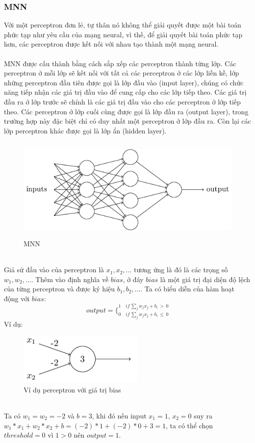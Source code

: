\subsubsection{MNN}
Với một perceptron đơn lẻ, tự thân nó không thể giải quyết được một bài toán 
phức tạp như yêu cầu của mạng neural, vì thế, để giải quyết bài toán phức tạp 
hơn, các perceptron được kết nối với nhau tạo thành một mạng neural.\\\\
MNN được cấu thành bằng cách sắp xếp các perceptron thành 
từng lớp. Các perceptron ở mỗi lớp sẽ kết nối với tất cả các perceptron ở các 
lớp liền kề, lớp những perceptron đầu tiên được gọi là lớp đầu vào (input layer), 
chúng có chức năng tiếp nhận các giá trị đầu vào để cung cấp cho các lớp tiếp 
theo. Các giá trị đầu ra ở lớp trước sẽ chính là các giá trị đầu vào cho 
các perceptron ở lớp tiếp theo. Các perceptron ở lớp cuối cùng được gọi là lớp 
đầu ra (output layer), trong trường hợp này đặc biệt chỉ có duy nhất một 
perceptron ở lớp đầu ra. Còn lại các lớp perceptron khác được gọi là lớp ẩn 
(hidden layer).\\
\begin{figure}[h!]
\centering
\includegraphics[height=2in, keepaspectratio=true]{multilayerneuralnetwork.png}
\caption{MNN}
\end{figure}\\
Giả sử đầu vào của perceptron là $x_1, x_2, ...$ tương ứng là đó là các trọng 
số $w_1, w_2, ...$. Thêm vào định nghĩa về $bias$, ở đây $bias$ là một giá trị 
đại diện độ lệch của từng perceptron và được ký hiệu $b_1, b_2, ...$. Ta có 
biểu diễn của hàm hoạt động với $bias$:\\
\[
  output = 
  \bigg\{
    _{0 \quad if \, \sum_j w_j x_j + b_i\, \leq \, 0}
    ^{1 \quad if \, \sum_j w_j x_j + b_i\, > \, 0}
\]
Ví dụ:\\
\begin{figure}[h!]
\centering
\includegraphics[height=1in, keepaspectratio=true]{exmln.png}
\caption{Ví dụ perceptron với giá trị bias}
\end{figure}\\
Ta có $w_1=w_2=-2$ và $b=3$, khi đó nếu input $x_1=1,\, x_2=0$ suy ra $ 
w_1*x_1+w_2*x_2+b=(-2)*1+(-2)*0+3=1$, ta có thể chọn $threshold=0$ vì $1>0$
nên $output=1$.
